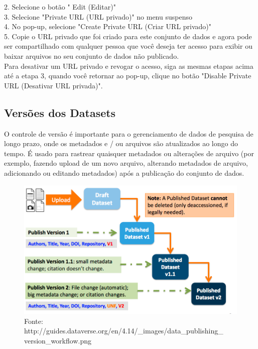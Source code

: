 \documentclass[12pt,hidelinks]{article}
\begin{document}
2. Selecione o botão " Edit (Editar)"\\

3. Selecione "Private URL (URL privado)" no menu suspenso\\

4. No pop-up, selecione "Create Private URL (Criar URL privado)"\\

5. Copie o URL privado que foi criado para este conjunto de dados e agora pode ser compartilhado com qualquer pessoa que você deseja ter acesso para exibir ou baixar arquivos no seu conjunto de dados não publicado.\\

Para desativar um URL privado e revogar o acesso, siga as mesmas etapas acima até a etapa 3, quando você retornar ao pop-up, clique no botão "Disable Private URL (Desativar URL privada)".
    
    \subsection{Versões dos Datasets}
    
\qquad O controle de versão é importante para o gerenciamento de dados de pesquisa de longo prazo, onde os metadados e / ou arquivos são atualizados ao longo do tempo. É usado para rastrear quaisquer metadados ou alterações de arquivo (por exemplo, fazendo upload de um novo arquivo, alterando metadados de arquivo, adicionando ou editando metadados) após a publicação do conjunto de dados.

\begin{figure}[!htp]
    \centering
      \includegraphics[scale=0.5]{ver.png}
        \caption{Fonte: http://guides.dataverse.org/en/4.14/\_images/data\_publishing\_
        version\_workflow.png}
    \label{Versão}
 \end{figure}
    
\end{document}

